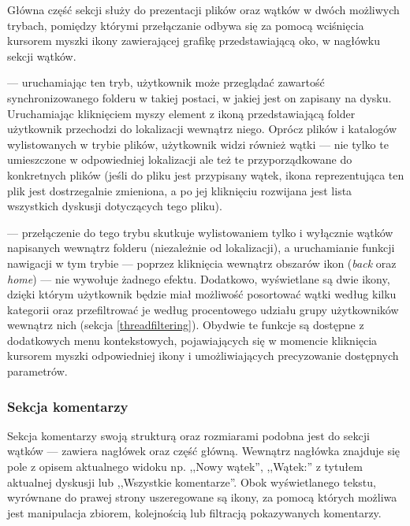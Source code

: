 \documentclass[polish,a4paper,twoside]{ppfcmthesis}
\begin{document}
Główna część sekcji służy do prezentacji plików oraz wątków w dwóch możliwych trybach, pomiędzy którymi przełączanie odbywa się za pomocą wciśnięcia kursorem myszki ikony zawierającej grafikę przedstawiającą oko, w nagłówku sekcji wątków.

\begin{description}[noitemsep]
  \item[Tryb plików] --- uruchamiając ten tryb, użytkownik może przeglądać zawartość synchronizowanego folderu w takiej postaci, w jakiej jest on zapisany na dysku. Uruchamiając kliknięciem myszy element z ikoną przedstawiającą folder użytkownik przechodzi do lokalizacji wewnątrz niego. Oprócz plików i katalogów wylistowanych w trybie plików, użytkownik widzi również wątki --- nie tylko te umieszczone w odpowiedniej lokalizacji ale też te przyporządkowane do konkretnych plików (jeśli do pliku jest przypisany wątek, ikona reprezentująca ten plik jest dostrzegalnie zmieniona, a po jej kliknięciu rozwijana jest lista wszystkich dyskusji dotyczących tego pliku).
  
  \item[Tryb wątków] --- przełączenie do tego trybu skutkuje wylistowaniem tylko i wyłącznie wątków napisanych wewnątrz folderu (niezależnie od lokalizacji), a uruchamianie funkcji nawigacji w tym trybie --- poprzez kliknięcia wewnątrz obszarów ikon (\emph{back} oraz \emph{home}) --- nie wywołuje żadnego efektu. Dodatkowo, wyświetlane są dwie ikony, dzięki którym użytkownik będzie miał możliwość posortować wątki według kilku kategorii oraz przefiltrować je według procentowego udziału grupy użytkowników wewnątrz nich (sekcja \ref{threadfiltering}). Obydwie te funkcje są dostępne z dodatkowych menu kontekstowych, pojawiających się w momencie kliknięcia kursorem myszki odpowiedniej ikony i umożliwiających precyzowanie dostępnych parametrów.
\end{description}


\subsubsection*{Sekcja komentarzy}

Sekcja komentarzy swoją strukturą oraz rozmiarami podobna jest do sekcji wątków --- zawiera nagłówek oraz część główną. Wewnątrz nagłówka znajduje się pole z opisem aktualnego widoku np. ,,Nowy wątek'', ,,Wątek:'' z tytułem aktualnej dyskusji lub ,,Wszystkie komentarze''. Obok wyświetlanego tekstu, wyrównane do prawej strony uszeregowane są ikony, za pomocą których możliwa jest manipulacja zbiorem, kolejnością lub filtracją pokazywanych komentarzy.
\end{document}
